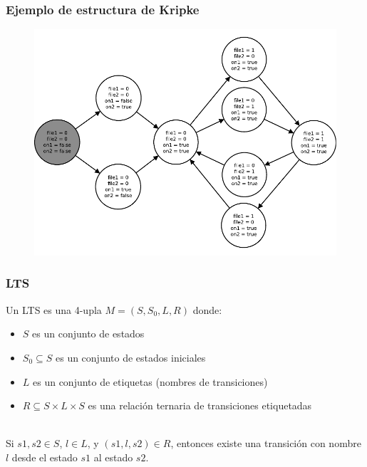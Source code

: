 \documentclass[serif]{beamer}
\begin{document}
\begin{frame}
\frametitle{Ejemplo de estructura de Kripke}
\begin{figure}
  \centering
    \includegraphics[scale=0.65]{imagenes/kripke.pdf}
\end{figure}
\end{frame}


\begin{frame}
\frametitle{LTS}
Un LTS es una 4-upla $M = (S,S_{0},L,R)$ donde:\\[0.3cm]
\begin{itemize}\itemsep10pt
\item $S$ es un conjunto de estados
\item $S_0 \subseteq S$ es un conjunto de estados iniciales
\item $L$ es un conjunto de etiquetas (nombres de transiciones)
\item $R \subseteq S \times L \times S$ es una relación ternaria de transiciones 
etiquetadas
\end{itemize}
~\\
Si $s1, s2 \in S$, $l \in L$, y $(s1,l,s2) \in R$, entonces existe una 
transición con nombre $l$ desde el estado $s1$ al estado $s2$.
\end{frame}
\end{document}

